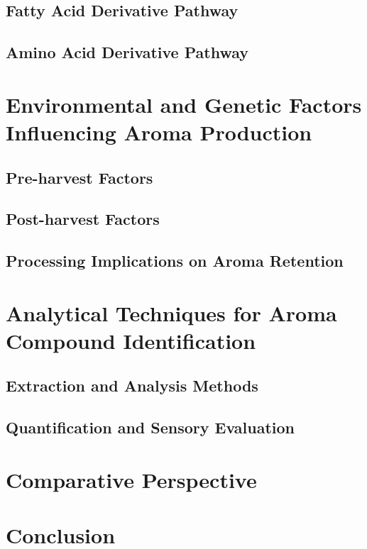 \subsection{Fatty Acid Derivative Pathway}

\subsection{Amino Acid Derivative Pathway}


\section{Environmental and Genetic Factors Influencing Aroma Production}
\subsection{Pre-harvest Factors}
\subsection{Post-harvest Factors}
\subsection{Processing Implications on Aroma Retention}


\section{Analytical Techniques for Aroma Compound Identification}
\subsection{Extraction and Analysis Methods}
\subsection{Quantification and Sensory Evaluation}

\section{Comparative Perspective}

\section{Conclusion}

